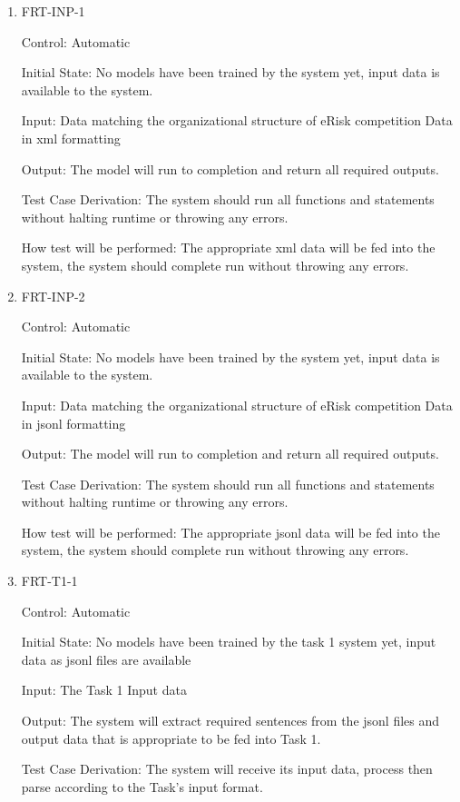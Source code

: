 \documentclass[12pt, titlepage]{article}
\begin{document}
\begin{enumerate}

\item{FRT-INP-1\\}

Control: Automatic

Initial State: No models have been trained by the system yet, input data is available to the system.

Input: Data matching the organizational structure of eRisk competition Data in xml formatting

Output: The model will run to completion and return all required outputs.

Test Case Derivation: The system should run all functions and statements without halting runtime or throwing any errors.

How test will be performed: The appropriate xml data will be fed into the system, the system should complete run without throwing any errors.

\item{FRT-INP-2\\}

Control: Automatic

Initial State: No models have been trained by the system yet, input data is available to the system.

Input: Data matching the organizational structure of eRisk competition Data in jsonl formatting

Output: The model will run to completion and return all required outputs.

Test Case Derivation: The system should run all functions and statements without halting runtime or throwing any errors.

How test will be performed: The appropriate jsonl data will be fed into the system, the system should complete run without throwing any errors.

\item{FRT-T1-1\\}

Control: Automatic

Initial State: No models have been trained by the task 1 system yet, input data as jsonl files are available

Input: The Task 1 Input data

Output: The system will extract required sentences from the jsonl files and output data that is appropriate to be fed into Task 1.

Test Case Derivation: The system will receive its input data, process then parse according to the Task's input format.


\end{enumerate}
\end{document}
